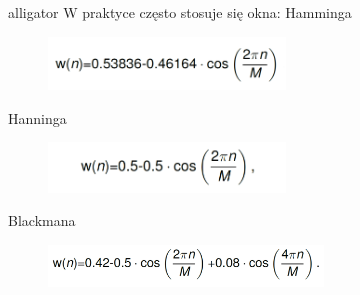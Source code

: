 \documentclass[12pt]{article}
\begin{document}
\begin{labeling}{alligator}
W praktyce często stosuje się okna:
\subitem Hamminga
\newpage
\begin{figure}[h!]
 \centering
 \includegraphics[width=6.3cm]{Hm.PNG}
 \vspace{-0.3cm}
 \label{gw}
\end{figure}

\subitem Hanninga

\begin{figure}[h!]
 \centering
 \includegraphics[width=6.3cm]{Hn.PNG}
 \vspace{-0.3cm}
 \label{gw}
\end{figure}

\subitem Blackmana

\begin{figure}[h!]
 \centering
 \includegraphics[width=7.3cm]{B.PNG}
 \vspace{-0.3cm}
 \label{gw}
\end{figure}



\end{labeling}
\end{document}
